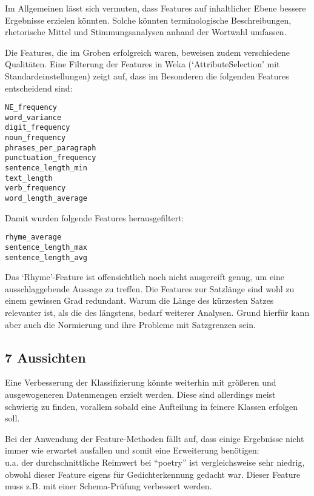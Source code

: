 \documentclass[]{article}
\begin{document}
Im Allgemeinen lässt sich vermuten, dass Features auf inhaltlicher Ebene
bessere Ergebnisse erzielen könnten. Solche könnten terminologische
Beschreibungen, rhetorische Mittel und Stimmungsanalysen anhand der
Wortwahl umfassen.

Die Features, die im Groben erfolgreich waren, beweisen zudem
verschiedene Qualitäten. Eine Filterung der Features in Weka
(`AttributeSelection' mit Standardeinstellungen) zeigt auf, dass im
Besonderen die folgenden Features entscheidend sind:

\vspace{4 mm}\begin{verbatim}
NE_frequency
word_variance
digit_frequency
noun_frequency
phrases_per_paragraph
punctuation_frequency
sentence_length_min
text_length
verb_frequency
word_length_average
\end{verbatim}\vspace{4 mm}

Damit wurden folgende Features herausgefiltert:

\vspace{4 mm}\begin{verbatim}
rhyme_average
sentence_length_max
sentence_length_avg
\end{verbatim}\vspace{4 mm}

Das `Rhyme'-Feature ist offensichtlich noch nicht ausgereift genug, um
eine ausschlaggebende Aussage zu treffen. Die Features zur Satzlänge
sind wohl zu einem gewissen Grad redundant. Warum die Länge des
kürzesten Satzes relevanter ist, als die des längstens, bedarf weiterer
Analysen. Grund hierfür kann aber auch die Normierung und ihre Probleme
mit Satzgrenzen sein.

\subsection{7 Aussichten}\label{aussichten}

Eine Verbesserung der Klassifizierung könnte weiterhin mit größeren und
ausgewogeneren Datenmengen erzielt werden. Diese sind allerdings meist
schwierig zu finden, vorallem sobald eine Aufteilung in feinere Klassen
erfolgen soll.

Bei der Anwendung der Feature-Methoden fällt auf, dass einige Ergebnisse
nicht immer wie erwartet ausfallen und somit eine Erweiterung
benötigen:\\
u.a. der durchschnittliche Reimwert bei ``poetry'' ist vergleichsweise
sehr niedrig, obwohl dieser Feature eigens für Gedichterkennung gedacht
war. Dieser Feature muss z.B. mit einer Schema-Prüfung verbessert
werden.
\end{document}
